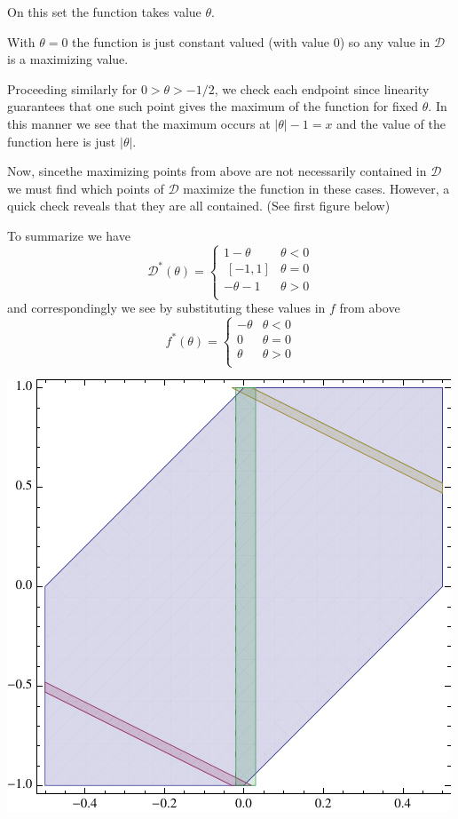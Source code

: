 \documentclass[12pt]{article}
\begin{document}
\begin{enumerate}
On this set the function takes value $\theta$.

With $\theta=0$ the function is just constant valued (with value 0) so any value in $\mathcal{D}$ is a maximizing value.

Proceeding similarly for $0>\theta>-1/2$, we check each endpoint since linearity guarantees that one such point gives the maximum of the function for fixed $\theta$. In this manner we see that the maximum occurs at $|\theta|-1=x$ and the value of the function here is just $|\theta|$.

Now, sincethe maximizing points from above are not necessarily contained in $\mathcal{D}$ we must find which points of $\mathcal{D}$ maximize the function in these cases. However, a quick check reveals that they are all contained. (See first figure below)

To summarize we have
\[\mathcal{D}^*(\theta) = \left\{ \begin{array}{ll} 1-\theta & \theta<0  \\ \ \!\![-1,1] & \theta=0 \\ -\theta-1 & \theta>0 \\ \end{array}\right.\]
and correspondingly we see by substituting these values in $f$ from above
\[f^*(\theta) = \left\{ \begin{array}{ll} -\theta & \theta<0 \\ 0 & \theta = 0 \\ \theta & \theta>0 \\ \end{array}\right.\]

\includegraphics{sketch3}


\end{enumerate}
\end{document}
